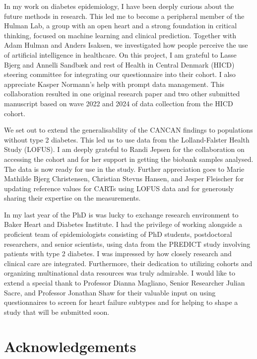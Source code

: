 \documentclass[
  letterpaper,
  headsepline=true,
  open=any]{scrbook}
\begin{document}
In my work on diabetes epidemiology, I have been deeply curious about
the future methods in research. This led me to become a peripheral
member of the Hulman Lab, a group with an open heart and a strong
foundation in critical thinking, focused on machine learning and
clinical prediction. Together with Adam Hulman and Anders Isaksen, we
investigated how people perceive the use of artificial intelligence in
healthcare. On this project, I am grateful to Lasse Bjerg and Annelli
Sandbæk and rest of Health in Central Denmark (HICD) steering committee
for integrating our questionnaire into their cohort. I also appreciate
Kasper Normann's help with prompt data management. This collaboration
resulted in one original research paper and two other submitted
manuscript based on wave 2022 and 2024 of data collection from the HICD
cohort.

We set out to extend the generalisability of the CANCAN findings to
populations without type 2 diabetes. This led us to use data from the
Lolland-Falster Health Study (LOFUS). I am deeply grateful to Randi
Jepsen for the collaboration on accessing the cohort and for her support
in getting the biobank samples analysed. The data is now ready for use
in the study. Further appreciation goes to Marie Mathilde Bjerg
Christensen, Christian Stevns Hansen, and Jesper Fleischer for updating
reference values for CARTs using LOFUS data and for generously sharing
their expertise on the measurements.

In my last year of the PhD is was lucky to exchange research environment
to Baker Heart and Diabetes Institute. I had the privilege of working
alongside a proficient team of epidemiologists consisting of PhD
students, postdoctoral researchers, and senior scientists, using data
from the PREDICT study involving patients with type 2 diabetes. I was
impressed by how closely research and clinical care are integrated.
Furthermore, their dedication to utilizing cohorts and organizing
multinational data resources was truly admirable. I would like to extend
a special thank to Professor Dianna Magliano, Senior Researcher Julian
Sacre, and Professor Jonathan Shaw for their valuable input on using
questionnaires to screen for heart failure subtypes and for helping to
shape a study that will be submitted soon.


\hypertarget{acknowledgements}{%
\chapter*{Acknowledgements}\label{acknowledgements}}
\end{document}
